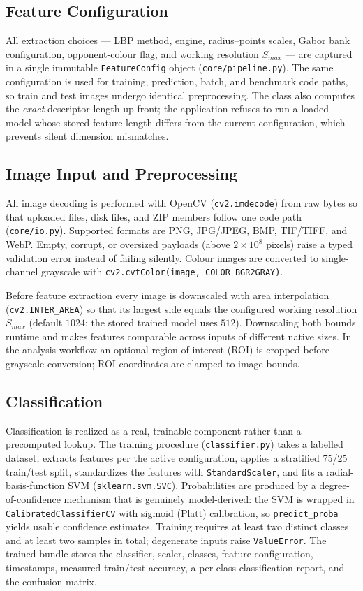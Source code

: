 \documentclass[conference]{IEEEtran}
\begin{document}
\subsection{Feature Configuration}
All extraction choices --- LBP method, engine, radius--points scales,
Gabor bank configuration, opponent-colour flag, and working resolution
$S_{max}$ --- are captured in a single immutable \texttt{FeatureConfig}
object (\texttt{core/pipeline.py}). The same configuration is used for
training, prediction, batch, and benchmark code paths, so train and test
images undergo identical preprocessing. The class also computes the
\emph{exact} descriptor length up front; the application refuses to run a
loaded model whose stored feature length differs from the current
configuration, which prevents silent dimension mismatches.

\subsection{Image Input and Preprocessing}
All image decoding is performed with OpenCV (\texttt{cv2.imdecode}) from
raw bytes so that uploaded files, disk files, and ZIP members follow one
code path (\texttt{core/io.py}). Supported formats are PNG, JPG/JPEG, BMP,
TIF/TIFF, and WebP. Empty, corrupt, or oversized payloads (above $2\times
10^{8}$ pixels) raise a typed validation error instead of failing silently.
Colour images are converted to single-channel grayscale with
\texttt{cv2.cvtColor(image, COLOR\_BGR2GRAY)}.

Before feature extraction every image is downscaled with area interpolation
(\texttt{cv2.INTER\_AREA}) so that its largest side equals the configured
working resolution $S_{max}$ (default $1024$; the stored trained model uses
$512$). Downscaling both bounds runtime and makes features comparable
across inputs of different native sizes. In the analysis workflow an
optional region of interest (ROI) is cropped before grayscale conversion;
ROI coordinates are clamped to image bounds.

\subsection{Classification}
Classification is realized as a real, trainable component rather than a
precomputed lookup. The training procedure (\texttt{classifier.py}) takes a
labelled dataset, extracts features per the active configuration, applies
a stratified 75/25 train/test split, standardizes the features with
\texttt{StandardScaler}, and fits a radial-basis-function SVM
(\texttt{sklearn.svm.SVC}). Probabilities are produced by a
degree-of-confidence mechanism that is genuinely model-derived: the SVM is
wrapped in \texttt{CalibratedClassifierCV} with sigmoid (Platt) calibration,
so \texttt{predict\_proba} yields usable confidence estimates. Training
requires at least two distinct classes and at least two samples in total;
degenerate inputs raise \texttt{ValueError}. The trained bundle stores the classifier,
scaler, classes, feature configuration, timestamps, measured train/test
accuracy, a per-class classification report, and the confusion matrix.
\end{document}
